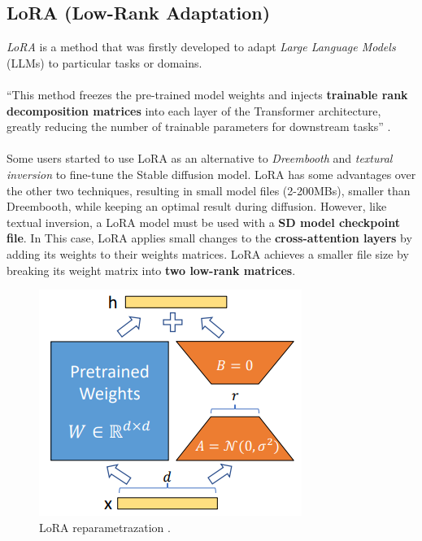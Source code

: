 \documentclass[preprint]{elsarticle}
\begin{document}
\subsection{LoRA (Low-Rank Adaptation)}
\emph{LoRA} \cite{hu2021lora} is a method that was firstly developed to adapt 
\emph{Large Language Models} (LLMs) to particular tasks or domains.\\ \\
``This method freezes 
the pre-trained model weights and injects \textbf{trainable rank decomposition matrices} 
into each layer of the Transformer architecture, greatly reducing the number of trainable 
parameters for downstream tasks'' \cite{hu2021lora}. \\\\
Some users started to use LoRA as an alternative to \emph{Dreembooth} \cite{ruiz2022dreambooth} 
and \emph{textural inversion} \cite{gal2022image} to 
fine-tune the Stable diffusion model. LoRA has some advantages over the other two techniques, 
resulting in small model files (2-200MBs), smaller than Dreembooth, 
while keeping an optimal result during diffusion. However, like textual inversion, 
a LoRA model must be used with a \textbf{SD model checkpoint file}.
In This case, LoRA applies small changes to the \textbf{cross-attention layers} by adding its 
weights to their weights matrices.
LoRA achieves a smaller file size by breaking its weight matrix into \textbf{two low-rank matrices}.


\begin{figure}[H]
	\centering
	\includegraphics[scale=0.5]{img/background_img/LoRA.png}
	\caption{LoRA reparametrazation \cite{hu2021lora}.}
	\label{fig:lora}
\end{figure}
\end{document}
